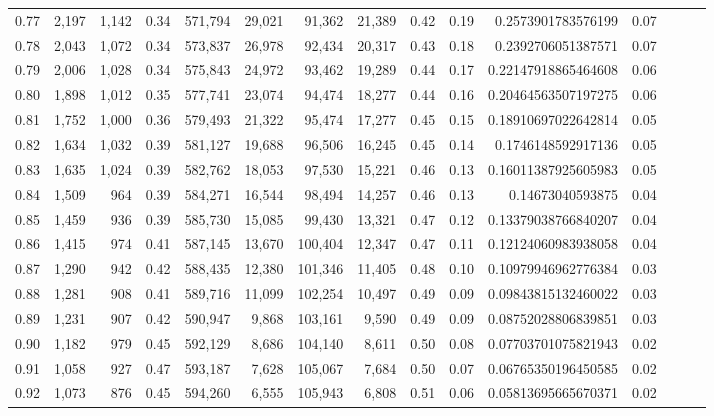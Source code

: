 \begin{tabular}{rrrrrrrrrrrrrrr}
0.77 &   2,197 &  1,142 &  0.34 &  571,794 &   29,021 &   91,362 &   21,389 &  0.42 &  0.19 &    0.2573901783576199 &      0.07 \\
0.78 &   2,043 &  1,072 &  0.34 &  573,837 &   26,978 &   92,434 &   20,317 &  0.43 &  0.18 &    0.2392706051387571 &      0.07 \\
0.79 &   2,006 &  1,028 &  0.34 &  575,843 &   24,972 &   93,462 &   19,289 &  0.44 &  0.17 &   0.22147918865464608 &      0.06 \\
0.80 &   1,898 &  1,012 &  0.35 &  577,741 &   23,074 &   94,474 &   18,277 &  0.44 &  0.16 &   0.20464563507197275 &      0.06 \\
0.81 &   1,752 &  1,000 &  0.36 &  579,493 &   21,322 &   95,474 &   17,277 &  0.45 &  0.15 &   0.18910697022642814 &      0.05 \\
0.82 &   1,634 &  1,032 &  0.39 &  581,127 &   19,688 &   96,506 &   16,245 &  0.45 &  0.14 &    0.1746148592917136 &      0.05 \\
0.83 &   1,635 &  1,024 &  0.39 &  582,762 &   18,053 &   97,530 &   15,221 &  0.46 &  0.13 &   0.16011387925605983 &      0.05 \\
0.84 &   1,509 &    964 &  0.39 &  584,271 &   16,544 &   98,494 &   14,257 &  0.46 &  0.13 &      0.14673040593875 &      0.04 \\
0.85 &   1,459 &    936 &  0.39 &  585,730 &   15,085 &   99,430 &   13,321 &  0.47 &  0.12 &   0.13379038766840207 &      0.04 \\
0.86 &   1,415 &    974 &  0.41 &  587,145 &   13,670 &  100,404 &   12,347 &  0.47 &  0.11 &   0.12124060983938058 &      0.04 \\
0.87 &   1,290 &    942 &  0.42 &  588,435 &   12,380 &  101,346 &   11,405 &  0.48 &  0.10 &   0.10979946962776384 &      0.03 \\
0.88 &   1,281 &    908 &  0.41 &  589,716 &   11,099 &  102,254 &   10,497 &  0.49 &  0.09 &   0.09843815132460022 &      0.03 \\
0.89 &   1,231 &    907 &  0.42 &  590,947 &    9,868 &  103,161 &    9,590 &  0.49 &  0.09 &   0.08752028806839851 &      0.03 \\
0.90 &   1,182 &    979 &  0.45 &  592,129 &    8,686 &  104,140 &    8,611 &  0.50 &  0.08 &   0.07703701075821943 &      0.02 \\
0.91 &   1,058 &    927 &  0.47 &  593,187 &    7,628 &  105,067 &    7,684 &  0.50 &  0.07 &   0.06765350196450585 &      0.02 \\
0.92 &   1,073 &    876 &  0.45 &  594,260 &    6,555 &  105,943 &    6,808 &  0.51 &  0.06 &   0.05813695665670371 &      0.02 \\

\end{tabular}
